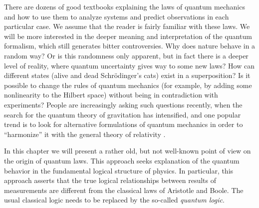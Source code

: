 \documentclass[nochecklpage]{stefan1}
\theoremstyle{definition}
\begin{document}
There are dozens of good textbooks explaining the laws of quantum
mechanics and how to use them to analyze systems and predict
observations in each particular case. We assume that the reader is
fairly familiar with these laws. We will be more interested in the
deeper meaning and interpretation of the quantum formalism, which still
generates bitter controversies. Why does nature behave in a random way?
Or is this randomness only apparent, but in fact there is a deeper level
of reality, where quantum uncertainty gives way to some new laws? How
can different states (alive and dead Schr\"{o}dinger's cats) exist in
a superposition? Is it possible to change the rules of quantum mechanics
(for example, by adding some nonlinearity to the Hilbert space) without
being in contradiction with experiments? People are increasingly asking
such questions recently, when the search for the quantum theory of
gravitation has intensified, and one popular trend is to look for
alternative formulations of quantum mechanics in order to ``harmonize''
it with the general theory of relativity \cite{Khrennikov}.

In this chapter we will present a rather old, but not well-known point
of view on the origin of quantum laws. This approach seeks
explanation of the quantum behavior in the fundamental logical structure
of physics. In particular, this approach asserts that the true logical
relationships between results of measurements are different from the
classical laws of Aristotle and Boole. The usual classical logic needs
to be replaced by the so-called \emph{quantum logic}.
\end{document}
